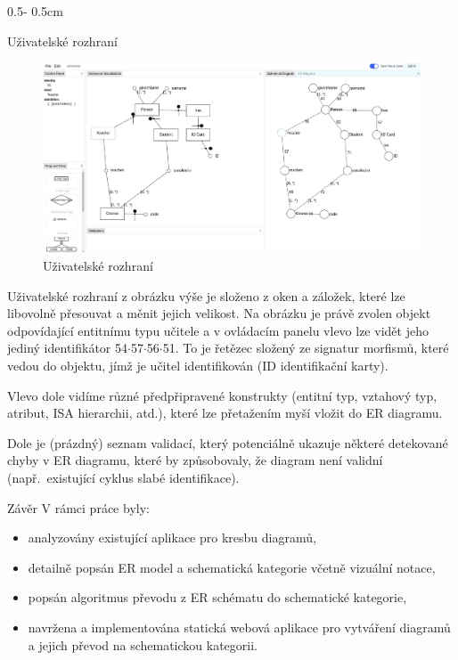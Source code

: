 \documentclass[a0paper]{uioposter}
\begin{document}
\begin{frame}
\begin{columns}[onlytextwidth]
    \begin{column}{0.5\textwidth - 0.5cm}
      \begin{block}{Uživatelské rozhraní}
        \begin{figure}
          \centering
          \includegraphics[width=\textwidth]{./images/identifier-screenshot.png}
          \caption*{Uživatelské rozhraní}
          \label{fig:user-interface}
        \end{figure}

        Uživatelské rozhraní z obrázku výše je složeno z oken a záložek, které lze libovolně přesouvat a měnit jejich velikost.
        Na obrázku je právě zvolen objekt odpovídající entitnímu typu učitele a v ovládacím panelu vlevo lze vidět jeho jediný identifikátor 54$\cdot$57$\cdot$56$\cdot$51.
        To je řetězec složený ze signatur morfismů, které vedou do objektu, jímž je učitel identifikován (ID identifikační karty).

        Vlevo dole vidíme různé předpřipravené konstrukty (entitní typ, vztahový typ, atribut, ISA hierarchii, atd.), které lze přetažením myší vložit do ER diagramu.

        Dole je (prázdný) seznam validací, který potenciálně ukazuje některé detekované chyby v ER diagramu, které by způsobovaly, že diagram není validní (např.~existující cyklus slabé identifikace).
      \end{block}
      \begin{block}{Závěr}
          V rámci práce byly:
          \begin{itemize}
              \item analyzovány existující aplikace pro kresbu diagramů,
              \item detailně popsán ER model a schematická kategorie včetně vizuální notace,
              \item popsán algoritmus převodu z ER schématu do schematické kategorie,
              \item navržena a implementována statická webová aplikace pro vytváření diagramů a jejich převod na schematickou kategorii.
          \end{itemize}


\end{block}
\end{column}
\end{columns}
\end{frame}
\end{document}
